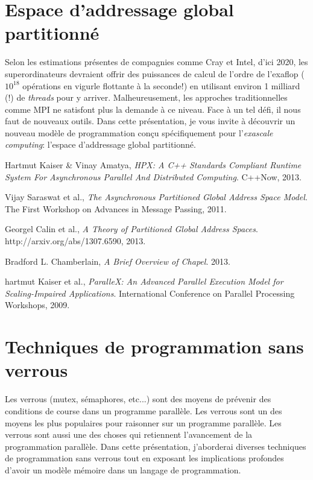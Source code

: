 \documentclass{article}
\begin{document}
\newpage

\section*{Espace d'addressage global partitionné}
Selon les estimations présentes de compagnies comme Cray et Intel, d'ici 2020, les superordinateurs devraient offrir des puissances de calcul de l'ordre de l'exaflop ($10^{18}$ opérations en vigurle flottante à la seconde!) en utilisant environ 1 milliard (!) de \textit{threads} pour y arriver. Malheureusement, les approches traditionnelles comme MPI ne satisfont plus la demande à ce niveau. Face à un tel défi, il nous faut de nouveaux outils. Dans cette présentation, je vous invite à découvrir un nouveau modèle de programmation conçu spécifiquement pour l'\textit{exascale computing}: l'espace d'addressage global partitionné. 

\renewcommand\refname{Références PGAS}
\begin{thebibliography}{9}
          Hartmut Kaiser \& Vinay Amatya,
          \emph{HPX: A C++ Standards Compliant Runtime System For Asynchronous Parallel And Distributed Computing}.
          C++Now, 2013.
          
          Vijay Saraswat et al.,
          \emph{The Asynchronous Partitioned Global Address Space Model}.
          The First Workshop on Advances in Message Passing, 2011.
          
          Georgel Calin et al.,
          \emph{A Theory of Partitioned Global Address Spaces}.
          http://arxiv.org/abs/1307.6590, 2013.
          
          Bradford L. Chamberlain,
          \emph{A Brief Overview of Chapel}.
          2013.
          
          hartmut Kaiser et al.,
          \emph{ParalleX: An Advanced Parallel Execution Model for Scaling-Impaired Applications}.
          International Conference on Parallel Processing Workshops, 2009.
\end{thebibliography}

\newpage

\section*{Techniques de programmation sans verrous}
Les verrous (mutex, sémaphores, etc...) sont des moyens de prévenir des conditions de course dans un programme parallèle. Les verrous sont un des moyens les plus populaires pour raisonner sur un programme parallèle. Les verrous sont aussi une des choses qui retiennent l'avancement de la programmation parallèle. Dans cette présentation, j'aborderai diverses techniques de programmation sans verrous tout en exposant les implications profondes d'avoir un modèle mémoire dans un langage de programmation.
\end{document}
